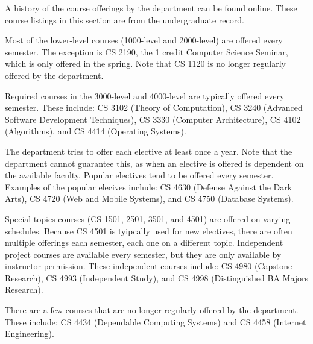 A history of the course offerings by the department can be found
online.
These course listings in this section are from the undergraduate
record.

Most of the lower-level courses (1000-level and 2000-level) are
offered every semester.  The exception is CS 2190, the 1 credit
Computer Science Seminar, which is only offered in the spring.  Note
that CS 1120 is no longer regularly offered by the department.

Required courses in the 3000-level and 4000-level are typically
offered every semester.  These include: CS 3102 (Theory of
Computation), CS 3240 (Advanced Software Development Techniques), CS
3330 (Computer Architecture), CS 4102 (Algorithms), and CS 4414
(Operating Systems).

The department tries to offer each elective at least once a year.
Note that the department cannot guarantee this, as when an elective is
offered is dependent on the available faculty.  Popular electives tend
to be offered every semester.  Examples of the popular elecives
include: CS 4630 (Defense Against the Dark Arts), CS 4720 (Web and
Mobile Systems), and CS 4750 (Database Systems).

Special topics courses (CS 1501, 2501, 3501, and 4501) are offered on
varying schedules.  Because CS 4501 is tyipcally used for new
electives, there are often multiple offerings each semester, each one
on a different topic.  Independent project courses are available every
semester, but they are only available by instructor permission.  These
independent courses include: CS 4980 (Capstone Research), CS 4993
(Independent Study), and CS 4998 (Distinguished BA Majors Research).

There are a few courses that are no longer regularly offered by the
department.  These include: CS 4434 (Dependable Computing Systems) and
CS 4458 (Internet Engineering).

\iffalse


